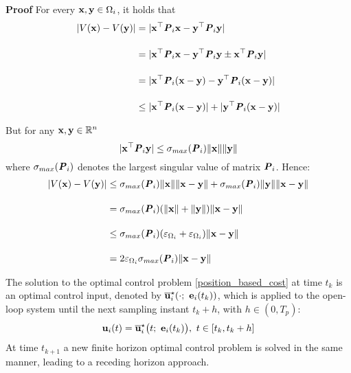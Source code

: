 \begin{gg_box}
\textbf{Proof} For every $\bm{\mathbf{x}}, \bm{\mathbf{y}} \in \Omega_i$, it holds that
\begin{align}
  |V(\bm{\mathbf{x}}) - V(\bm{\mathbf{y}})| &= |\bm{\mathbf{x}}^{\top} \bm{\mathit{P}}_i \bm{\mathbf{x}} - \bm{\mathbf{y}}^{\top} \bm{\mathit{P}}_i \bm{\mathbf{y}}| \\[2.5ex]
    &= |\bm{\mathbf{x}}^{\top} \bm{\mathit{P}}_i \bm{\mathbf{x}} - \bm{\mathbf{y}}^{\top} \bm{\mathit{P}}_i \bm{\mathbf{y}} \pm \bm{\mathbf{x}}^{\top} \bm{\mathit{P}}_i \bm{\mathbf{y}}| \\[2.5ex]
    &= |\bm{\mathbf{x}}^{\top} \bm{\mathit{P}}_i (\bm{\mathbf{x}} -\bm{\mathbf{y}}) - \bm{\mathbf{y}}^{\top} \bm{\mathit{P}}_i (\bm{\mathbf{x}}-\bm{\mathbf{y}})| \\[2.5ex]
    &\leq |\bm{\mathbf{x}}^{\top} \bm{\mathit{P}}_i (\bm{\mathbf{x}} -\bm{\mathbf{y}})| + |\bm{\mathbf{y}}^{\top} \bm{\mathit{P}}_i (\bm{\mathbf{x}}-\bm{\mathbf{y}})|
\end{align}

But for any $\bm{\mathbf{x}}, \bm{\mathbf{y}} \in \mathbb{R}^n$
$$|\bm{\mathbf{x}}^{\top} \bm{\mathit{P}}_i \bm{\mathbf{y}}| \leq \sigma_{max}(\bm{\mathit{P}}_i) \|\bm{\mathbf{x}}\| \|\bm{\mathbf{y}}\|$$
where $\sigma_{max}(\bm{\mathit{P}}_i)$ denotes the largest singular value of matrix
$\bm{\mathit{P}}_i$. Hence:
\begin{align}
  |V(\bm{\mathbf{x}}) - V(\bm{\mathbf{y}})| &\leq
  \sigma_{max}(\bm{\mathit{P}}_i) \|\bm{\mathbf{x}}\| \|\bm{\mathbf{x}} - \bm{\mathbf{y}}\| +
  \sigma_{max}(\bm{\mathit{P}}_i) \|\bm{\mathbf{y}}\| \|\bm{\mathbf{x}} - \bm{\mathbf{y}}\| \\[2.5ex]
  &= \sigma_{max}(\bm{\mathit{P}}_i) (\|\bm{\mathbf{x}}\| + \|\bm{\mathbf{y}}\|)\|\bm{\mathbf{x}} - \bm{\mathbf{y}}\| \\[2.5ex]
  & \leq \sigma_{max}(\bm{\mathit{P}}_i) (\varepsilon_{\Omega_i} + \varepsilon_{\Omega_i})\|\bm{\mathbf{x}} - \bm{\mathbf{y}}\| \\[2.5ex]
  &= 2 \varepsilon_{\Omega_i} \sigma_{max}(\bm{\mathit{P}}_i) \|\bm{\mathbf{x}} - \bm{\mathbf{y}}\|
\end{align}
\qedsymbol
\end{gg_box}


The solution to the optimal control problem \eqref{position_based_cost}
at time $t_k$ is an optimal control input, denoted by
$\overline{\bm{\mathbf{u}}}_i^{\star}(\cdot;\ \bm{\mathbf{e}}_i(t_k))$, which
is applied to the open-loop system until the next sampling instant $t_k + h$,
with $h \in (0,T_p)$:
\begin{align}
  \bm{\mathbf{u}}_i(t) = \overline{\bm{\mathbf{u}}}_i^{\star}\big(t;\ \bm{\mathbf{e}}_i(t_k)\big),\  t \in [t_k, t_k + h]
 \label{eq:position_based_optimal_u}
\end{align}
At time $t_{k+1}$ a new finite horizon optimal control problem is solved in the
same manner, leading to a receding horizon approach.

